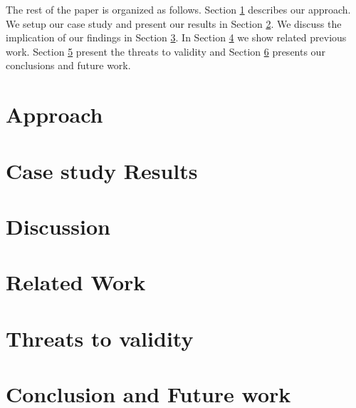 \documentclass{sig-alternate}
\begin{document}

The rest of the paper is organized as follows. Section \ref{sec:approach} describes our approach. We setup our case study and present our
results in Section \ref{sec:case_study_results}. We discuss the implication of our findings in Section \ref{sec:discussion}. In Section \ref{sec:related_work} we show related previous work. Section \ref{sec:threats_to_validity} present the threats to validity and Section \ref{sec:conclusion} presents our conclusions and future work.  

\section{Approach}
\label{sec:approach}


\section{Case study Results}
\label{sec:case_study_results}


\section{Discussion}
\label{sec:discussion}


\section{Related Work}
\label{sec:related_work}


\section{Threats to validity}
\label{sec:threats_to_validity}


\section{Conclusion and Future work}
\label{sec:conclusion}



  


\end{document}
